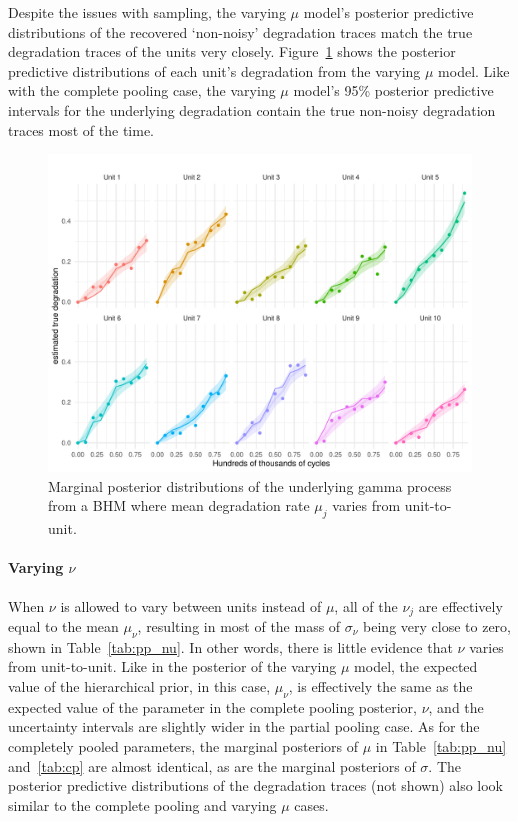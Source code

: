Despite the issues with sampling, the varying $\mu$ model's posterior predictive distributions of the recovered `non-noisy' degradation traces match the true degradation traces of the units very closely. Figure~\ref{fig:pp_mu_filtered} shows the posterior predictive distributions of each unit's degradation from the varying $\mu$ model. Like with the complete pooling case, the varying $\mu$ model's 95\% posterior predictive intervals for the underlying degradation contain the true non-noisy degradation traces most of the time.

\begin{figure}
   \centering
   \includegraphics[width=0.8\columnwidth]{./figures/ch-5/plot-pp-mu-filtered.pdf}
   \caption{Marginal posterior distributions of the underlying gamma process from a BHM where mean degradation rate $\mu_j$ varies from unit-to-unit.}
   \label{fig:pp_mu_filtered}
\end{figure}

\paragraph{Varying $\nu$} When $\nu$ is allowed to vary between units instead of $\mu$, all of the $\nu_j$ are effectively equal to the mean $\mu_\nu$, resulting in most of the mass of $\sigma_\nu$ being very close to zero, shown in Table~\ref{tab:pp_nu}. In other words, there is little evidence that $\nu$ varies from unit-to-unit. Like in the posterior of the varying $\mu$ model, the expected value of the hierarchical prior, in this case, $\mu_\nu$, is effectively the same as the expected value of the parameter in the complete pooling posterior, $\nu$, and the uncertainty intervals are slightly wider in the partial pooling case. As for the completely pooled parameters, the marginal posteriors of $\mu$ in Table~\ref{tab:pp_nu} and~\ref{tab:cp} are almost identical, as are the marginal posteriors of $\sigma$. The posterior predictive distributions of the degradation traces (not shown) also look similar to the complete pooling and varying $\mu$ cases.

